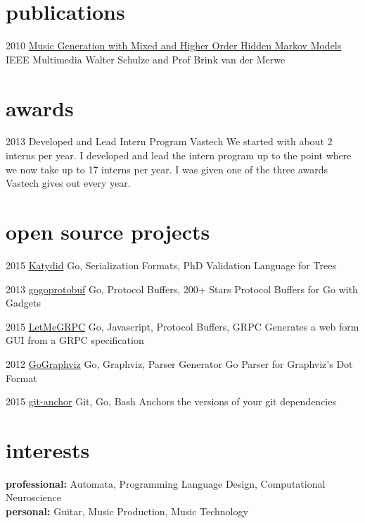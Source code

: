 \documentclass[print]{friggeri-cv} %
\begin{document}
\section{publications}


\begin{entrylist}

\entry
{2010}
{\href{http://doi.ieeecomputersociety.org/10.1109/MMUL.2010.44}{Music Generation with Mixed and Higher Order Hidden Markov Models}}
{IEEE Multimedia}
{Walter Schulze and Prof Brink van der Merwe}

\end{entrylist}

\section{awards}

\begin{entrylist}

\entry
{2013}
{Developed and Lead Intern Program}
{Vastech}
{We started with about 2 interns per year. I developed and lead the intern program up to the point where we now take up to 17 interns per year.  I was given one of the three awards Vastech gives out every year.}

\end{entrylist}

\section{open source projects}


\begin{entrylist}

\entry
{2015}
{\href{https://github.com/katydid/katydid}{Katydid}}
{Go, Serialization Formats, PhD}
{Validation Language for Trees}

\entry
{2013}
{\href{https://github.com/gogo/protobuf}{gogoprotobuf}}
{Go, Protocol Buffers, 200+ Stars}
{Protocol Buffers for Go with Gadgets}

\entry
{2015}
{\href{https://github.com/gogo/letmegrpc}{LetMeGRPC}}
{Go, Javascript, Protocol Buffers, GRPC}
{Generates a web form GUI from a GRPC specification}

\entry
{2012}
{\href{https://github.com/awalterschulze/gographviz}{GoGraphviz}}
{Go, Graphviz, Parser Generator}
{Go Parser for Graphviz's Dot Format}

\entry
{2015}
{\href{https://github.com/awalterschulze/git-anchor}{git-anchor}}
{Git, Go, Bash}
{Anchors the versions of your git dependencies}

\end{entrylist}

\section{interests}

\textbf{professional:} Automata, Programming Language Design, Computational Neuroscience \\
\textbf{personal:} Guitar, Music Production, Music Technology
\end{document}
